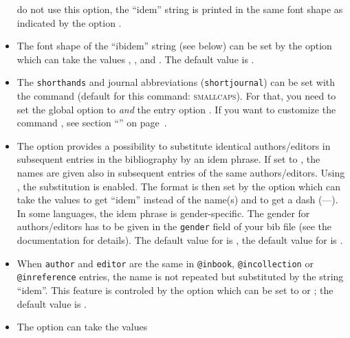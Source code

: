 \documentclass[english]{scrartcl}
\begin{document}
\begin{itemize}
	      do not use this option, the \enquote{idem} string is printed in the 
	      same font shape as indicated by the option .
	\item The font shape of the \enquote{ibidem} string (see below) can be set by
	      the option  which can take the values 
	      , ,  and . The 
	      default value is .
  \item The
	      \texttt{shorthands} and journal abbreviations (\texttt{shortjournal})
        can be set with the command  (default for this command:
        \textsc{smallcaps}). For that, you need to set the global option
         to  \emph{and} the entry option .
        If you want to customize the command , see section
        \enquote{} on page~\pageref{mkbibacro-anpassen}.
	\item The option  provides a possibility to substitute
	      identical authors\slash editors in subsequent entries in the
	      bibliography by an idem phrase. If set to , the names are
	      given also in subsequent entries of the same authors\slash editors.
	      Using , the substitution is enabled. The format
	      is then set by the option  which can take the
	      values  to get \enquote{idem} instead of the name(s) and 
	       to get a dash (---). In some languages, the idem phrase
	      is gender-specific. The gender for authors\slash editors has to be
	      given in the \texttt{gender} field of your bib file (see the \bl{}
	      documentation for details). The default value for  is
	      , the default value for  is
	      .
	\item When \texttt{author} and \texttt{editor} are the same in 
	      \texttt{@inbook}, \texttt{@incollection} or \texttt{@inreference} entries, the name is not 
	      repeated but substituted by the string \enquote{idem}. This feature
	      is controled by the option  which can be set to 
	       or ; the default value is .
  \item The option  can take the values 

\end{itemize}
\end{document}
